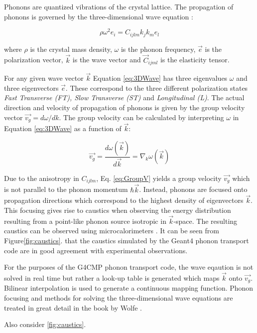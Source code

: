 \documentclass[preprint,12pt]{elsarticle}
\begin{document}
Phonons are quantized vibrations of the crystal lattice. The propagation of phonons is governed by the three-dimensional wave equation \cite{Wolfe}:

\begin{equation}
\label{eq:3DWave}
\rho \omega ^2e_i=C_{ijlm}k_jk_me_l
\end{equation}

where $\rho$ is the crystal mass density, $\omega$ is the phonon frequency, $\vec{e}$ is the polarization vector, $\vec{k}$ is the wave vector and $\vec{C}_{ijml}$ is the elasticity tensor.

For any given wave vector $\vec{k}$ Equation \ref{eq:3DWave} has three eigenvalues $\omega$ and three eigenvectors $\vec{e}$. These correspond to the three different polarization states \textit{Fast Transverse (FT), Slow Transverse (ST)} and \textit{Longitudinal (L)}. The actual direction and velocity of propagation of phonons is given by the group velocity vector $\vec{v_g} = d\omega/dk$. The group velocity can be calculated by interpreting $\omega$ in Equation \ref{eq:3DWave} as a function of $\vec{k}$:

\begin{equation}
\label{eq:GroupV}
\vec{v_g}=\frac{d \omega (\vec{k})}{d\vec{k}}=\nabla_k \omega (\vec{k})
\end{equation}

Due to the anisotropy in $C_{ijlm}$, Eq. \ref{eq:GroupV} yields a group velocity $\vec{v_g}$ which is not parallel to the phonon momentum $\hbar\vec{k}$. Instead, phonons are focused onto propagation directions which correspond to the highest density of eigenvectors $\vec{k}$. This focusing gives rise to caustics when observing the energy  distribution resulting from a point-like phonon source isotropic in $\vec{k}$-space. The resulting caustics can be observed using microcalorimeters \cite{Nothrop}. It can be seen from Figure\ref{fig:caustics}. that the caustics simulated by the Geant4 phonon transport code are in good agreement with experimental observations. 

For the purposes of the G4CMP phonon transport code, the wave eqaution is not solved in real time but rather a look-up table is generated which maps $\vec{k}$ onto $\vec{v_g}$. Bilinear interpolation is used to generate a continuous mapping function. Phonon focusing and methods for solving the three-dimensional wave equations are treated in great detail in the book by Wolfe \cite{Wolfe}.

Also consider \ref{fig:caustics}.
\end{document}

